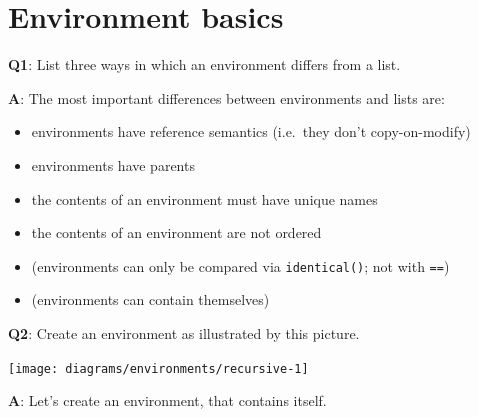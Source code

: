 \documentclass[
]{krantz}
\makeatletter
\newenvironment{Shaded}{\begin{snugshade}}{\end{snugshade}}
\newcommand{\CommentTok}[1]{\textcolor[rgb]{0.56,0.35,0.01}{\textit{#1}}}
\newcommand{\KeywordTok}[1]{\textcolor[rgb]{0.13,0.29,0.53}{\textbf{#1}}}
\newcommand{\NormalTok}[1]{#1}
\newcommand{\OperatorTok}[1]{\textcolor[rgb]{0.81,0.36,0.00}{\textbf{#1}}}
\newcommand{\StringTok}[1]{\textcolor[rgb]{0.31,0.60,0.02}{#1}}
\providecommand{\tightlist}{%
  \setlength{\itemsep}{0pt}\setlength{\parskip}{0pt}}
\newenvironment{kframe}{%
\medskip{}
\setlength{\fboxsep}{.8em}
 \def\at@end@of@kframe{}%
 \ifinner\ifhmode%
  \def\at@end@of@kframe{\end{minipage}}%
  \begin{minipage}{\columnwidth}%
 \fi\fi%
 \def\FrameCommand##1{\hskip\@totalleftmargin \hskip-\fboxsep
 \colorbox{shadecolor}{##1}\hskip-\fboxsep
     \hskip-\linewidth \hskip-\@totalleftmargin \hskip\columnwidth}%
 \MakeFramed {\advance\hsize-\width
   \@totalleftmargin\z@ \linewidth\hsize
   \@setminipage}}%
 {\par\unskip\endMakeFramed%
 \at@end@of@kframe}
\renewenvironment{Shaded}{\begin{kframe}}{\end{kframe}}
\renewcommand{\KeywordTok} [1]{\textcolor[rgb]{0.00,0.44,0.13}{{#1}}}
\renewcommand{\StringTok}  [1]{\textcolor[rgb]{0.25,0.44,0.63}{{#1}}}
\renewcommand{\CommentTok} [1]{\textcolor[rgb]{0.38,0.63,0.69}{{#1}}}
\renewcommand{\NormalTok}  [1]{{#1}}
\makeatother
\begin{document}

\hypertarget{environment-basics}{%
\section{Environment basics}\label{environment-basics}}

\textbf{{Q1}}: List three ways in which an environment differs from a list.

\textbf{{A}}: The most important differences between environments and lists are:

\begin{itemize}
\tightlist
\item
  environments have reference semantics (i.e.~they don't copy-on-modify)
\item
  environments have parents
\item
  the contents of an environment must have unique names
\item
  the contents of an environment are not ordered
\item
  (environments can only be compared via \texttt{identical()}; not with \texttt{==})
\item
  (environments can contain themselves)
\end{itemize}

\textbf{{Q2}}: Create an environment as illustrated by this picture.

\begin{center}\texttt{[image: diagrams/environments/recursive-1]} \end{center}

\textbf{{A}}: Let's create an environment, that contains itself.

\begin{Shaded}
\end{Shaded}
\end{document}
